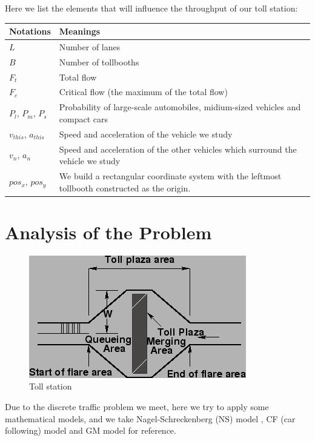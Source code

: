 \documentclass{mcmthesis}
\begin{document}
Here we list the elements that will influence the throughput of our toll station:

\begin{tabular}{|m{7cm}<{\centering}|p{7cm}<{\centering}|}
	\hline
	Notations & Meanings \\
	\hline
	 $L$ &  Number of lanes \\
	\hline
	 $B$ &  Number of tollbooths\\
	 \hline
     $F_t$ & 	 Total flow\\
     \hline
     $F_c$ & Critical flow (the maximum of the total flow)\\
     \hline
     $P_l$,  $P_m$, $P_s$ & Probability of large-scale automobiles, midium-sized vehicles and compact cars\\
     \hline
     $v_{this}$, $a_{this}$ & Speed and acceleration of the vehicle we study\\
     \hline
      $v_n$, $a_n$ &  Speed and acceleration of the other vehicles which surround the vehicle we study\\
      \hline
      $pos_x$, $pos_y$ & We build a rectangular coordinate system  with the leftmost tollbooth constructed as the origin.\\
   \hline
     
\end{tabular}


\section{Analysis of the Problem}
\begin{figure}[htbp]
\small
\centering
\caption{Toll station \cite{note}} \label{fig:Ts}
\includegraphics{img3.png}
\end{figure}

Due to the discrete traffic problem we meet, here we try to apply some mathematical models, and we take Nagel-Schreckenberg (NS) model \cite{acelluar}, CF (car following) model and GM model for reference.
\end{document}

